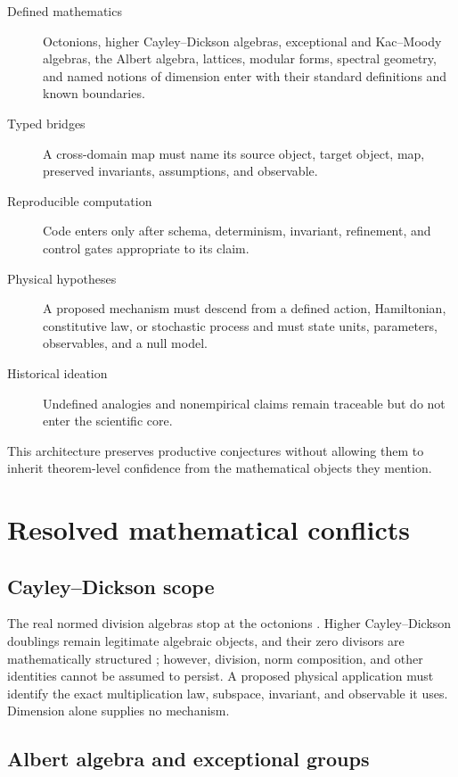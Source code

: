 \begin{description}
  \item[Defined mathematics] Octonions, higher Cayley--Dickson algebras,
    exceptional and Kac--Moody algebras, the Albert algebra, lattices, modular
    forms, spectral geometry, and named notions of dimension enter with their
    standard definitions and known boundaries.
  \item[Typed bridges] A cross-domain map must name its source object, target
    object, map, preserved invariants, assumptions, and observable.
  \item[Reproducible computation] Code enters only after schema, determinism,
    invariant, refinement, and control gates appropriate to its claim.
  \item[Physical hypotheses] A proposed mechanism must descend from a defined
    action, Hamiltonian, constitutive law, or stochastic process and must state
    units, parameters, observables, and a null model.
  \item[Historical ideation] Undefined analogies and nonempirical claims remain
    traceable but do not enter the scientific core.
\end{description}

This architecture preserves productive conjectures without allowing them to
inherit theorem-level confidence from the mathematical objects they mention.

\section{Resolved mathematical conflicts}

\subsection{Cayley--Dickson scope}

The real normed division algebras stop at the octonions
\citep{baez2001octonions}. Higher Cayley--Dickson doublings remain legitimate
algebraic objects, and their zero divisors are mathematically structured
\citep{moreno2005constructing}; however, division, norm composition, and other
identities cannot be assumed to persist. A proposed physical application must
identify the exact multiplication law, subspace, invariant, and observable it
uses. Dimension alone supplies no mechanism.

\subsection{Albert algebra and exceptional groups}

